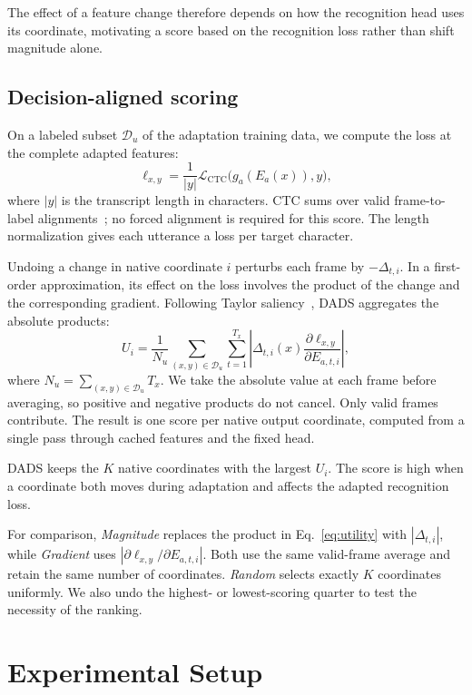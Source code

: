 \documentclass{article}
\newcommand{\CTC}{\mathrm{CTC}}
\newcommand{\Du}{\mathcal{D}_{u}}
\begin{document}
The effect of a feature change therefore depends on how the recognition head uses its coordinate, motivating a score based on the recognition loss rather than shift magnitude alone.

\subsection{Decision-aligned scoring}
On a labeled subset $\Du$ of the adaptation training data, we compute the loss at the complete adapted features:
\begin{equation}
 \ell_{x,y}=\frac{1}{|y|}\mathcal{L}_{\CTC}\bigl(g_a(E_a(x)),y\bigr),
 \label{eq:loss}
\end{equation}
where $|y|$ is the transcript length in characters. CTC sums over valid frame-to-label alignments~\cite{graves2006ctc}; no forced alignment is required for this score. The length normalization gives each utterance a loss per target character.

Undoing a change in native coordinate $i$ perturbs each frame by $-\Delta_{t,i}$. In a first-order approximation, its effect on the loss involves the product of the change and the corresponding gradient. Following Taylor saliency~\cite{molchanov2017pruning}, DADS aggregates the absolute products:
\begin{equation}
 U_i=\frac{1}{N_u}\sum_{(x,y)\in\Du}\sum_{t=1}^{T_x}
 \left|\Delta_{t,i}(x)\frac{\partial\ell_{x,y}}{\partial E_{a,t,i}}\right|,
 \label{eq:utility}
\end{equation}
where $N_u=\sum_{(x,y)\in\Du}T_x$. We take the absolute value at each frame before averaging, so positive and negative products do not cancel. Only valid frames contribute. The result is one score per native output coordinate, computed from a single pass through cached features and the fixed head.

DADS keeps the $K$ native coordinates with the largest $U_i$. The score is high when a coordinate both moves during adaptation and affects the adapted recognition loss.

For comparison, \emph{Magnitude} replaces the product in Eq.~\eqref{eq:utility} with $|\Delta_{t,i}|$, while \emph{Gradient} uses $|\partial\ell_{x,y}/\partial E_{a,t,i}|$. Both use the same valid-frame average and retain the same number of coordinates. \emph{Random} selects exactly $K$ coordinates uniformly. We also undo the highest- or lowest-scoring quarter to test the necessity of the ranking.

\section{Experimental Setup}
\label{sec:setup}
\end{document}
